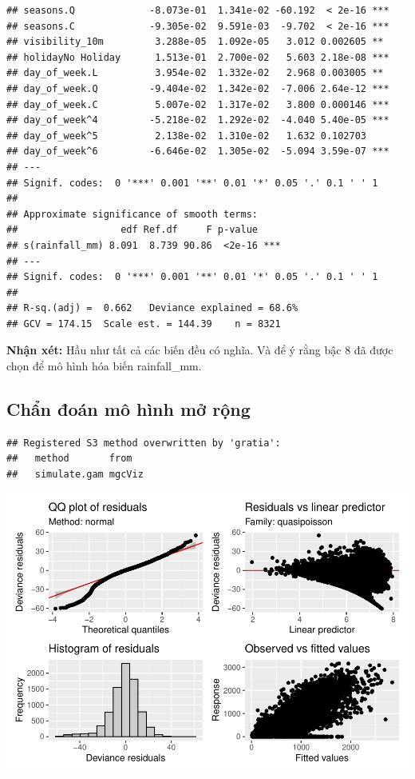 \documentclass[
  11pt,
  letterpaper,
]{article}
\begin{document}
\begin{verbatim}
## seasons.Q             -8.073e-01  1.341e-02 -60.192  < 2e-16 ***
## seasons.C             -9.305e-02  9.591e-03  -9.702  < 2e-16 ***
## visibility_10m         3.288e-05  1.092e-05   3.012 0.002605 ** 
## holidayNo Holiday      1.513e-01  2.700e-02   5.603 2.18e-08 ***
## day_of_week.L          3.954e-02  1.332e-02   2.968 0.003005 ** 
## day_of_week.Q         -9.404e-02  1.342e-02  -7.006 2.64e-12 ***
## day_of_week.C          5.007e-02  1.317e-02   3.800 0.000146 ***
## day_of_week^4         -5.218e-02  1.292e-02  -4.040 5.40e-05 ***
## day_of_week^5          2.138e-02  1.310e-02   1.632 0.102703    
## day_of_week^6         -6.646e-02  1.305e-02  -5.094 3.59e-07 ***
## ---
## Signif. codes:  0 '***' 0.001 '**' 0.01 '*' 0.05 '.' 0.1 ' ' 1
## 
## Approximate significance of smooth terms:
##                  edf Ref.df     F p-value    
## s(rainfall_mm) 8.091  8.739 90.86  <2e-16 ***
## ---
## Signif. codes:  0 '***' 0.001 '**' 0.01 '*' 0.05 '.' 0.1 ' ' 1
## 
## R-sq.(adj) =  0.662   Deviance explained = 68.6%
## GCV = 174.15  Scale est. = 144.39    n = 8321
\end{verbatim}

\textbf{Nhận xét:} Hầu như tất cả các biến đều có nghĩa. Và để ý rằng bậc 8 đã được chọn để mô hình hóa biến rainfall\_mm.

\subsection{Chẩn đoán mô hình mở rộng}

\begin{verbatim}
## Registered S3 method overwritten by 'gratia':
##   method       from  
##   simulate.gam mgcViz
\end{verbatim}

\begin{center}\includegraphics{Final_Project_files/figure-latex/unnamed-chunk-42-1} \end{center}
\end{document}
